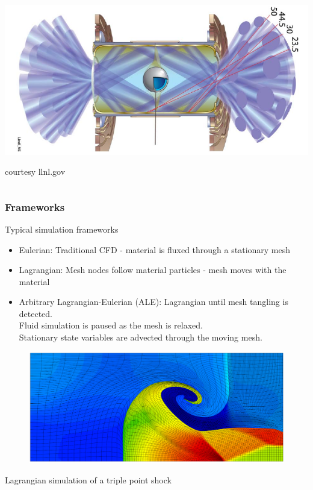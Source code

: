 \documentclass[8pt,xcolor=svgnames]{beamer}
\begin{document}
\begin{frame}
\begin{columns}
\begin{column}{0.5\textwidth}
 \includegraphics[width=1.0\textwidth,keepaspectratio=true]{./Images/nifIllustration2.png}

 \tiny{courtesy llnl.gov}
\end{column}
\end{columns}



\end{frame}


\begin{frame}
 \frametitle{Frameworks}
\medskip
\begin{block}{Typical simulation frameworks}
\begin{itemize}
 \item Eulerian: Traditional CFD - material is fluxed through a stationary mesh
 \item Lagrangian: Mesh nodes follow material particles - mesh moves with the material
 \item Arbitrary Lagrangian-Eulerian (ALE): Lagrangian until mesh tangling is detected. \\Fluid simulation is paused as the mesh is relaxed. \\
Stationary state variables are advected through the moving mesh.
\end{itemize}
\end{block}
\vspace*{-1ex}
\begin{figure}[h!]
 \centering
 \includegraphics[height=0.55\textheight,keepaspectratio=true]{./Images/triple.png}
\end{figure}
\vspace*{-3ex}
\begin{center}
 Lagrangian simulation of a triple point shock
\end{center}

\end{frame}
\end{document}
